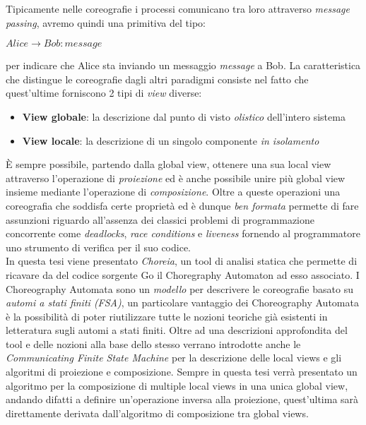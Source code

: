 Tipicamente nelle coreografie i processi comunicano tra loro attraverso \emph{message passing}, avremo quindi una primitiva del tipo:
\begin{center}
    $Alice \rightarrow Bob : message$
\end{center}
per indicare che Alice sta inviando un messaggio \emph{message} a Bob. La caratteristica che distingue le coreografie dagli altri paradigmi consiste nel fatto che quest'ultime forniscono 2 tipi di \emph{view} diverse:
\begin{itemize}
    \item \textbf{View globale}: la descrizione dal punto di visto \emph{olistico} dell'intero sistema
    \item \textbf{View locale}: la descrizione di un singolo componente \emph{in isolamento}
\end{itemize}
È sempre possibile, partendo dalla global view, ottenere una sua local view attraverso l'operazione di \emph{proiezione} ed è anche possibile unire più global view insieme mediante l'operazione di \emph{composizione}\cite{CA_Composition}. Oltre a queste operazioni una coreografia che soddisfa certe proprietà ed è dunque \emph{ben formata} permette di fare assunzioni riguardo all'assenza dei classici problemi di programmazione concorrente come \emph{deadlocks}, \emph{race conditions} e \emph{liveness} fornendo al programmatore uno strumento di verifica per il suo codice.\bigskip \\
In questa tesi viene presentato \emph{Choreia}, un tool di analisi statica che permette di ricavare da del codice sorgente Go il Choregraphy Automaton ad esso associato. I Choreography Automata sono un \emph{modello} per descrivere le coreografie basato su \emph{automi a stati finiti (FSA)}, un particolare vantaggio dei Choreography Automata è la possibilità di poter riutilizzare tutte le nozioni teoriche già esistenti in letteratura sugli automi a stati finiti. Oltre ad una descrizioni approfondita del tool e delle nozioni alla base dello stesso verrano introdotte anche le \emph{Communicating Finite State Machine} per la descrizione delle local views e gli algoritmi di proiezione e composizione. Sempre in questa tesi verrà presentato un algoritmo per la composizione di multiple local views in una unica global view, andando difatti a definire un'operazione inversa alla proiezione, quest'ultima sarà direttamente derivata dall'algoritmo di composizione tra global views.
